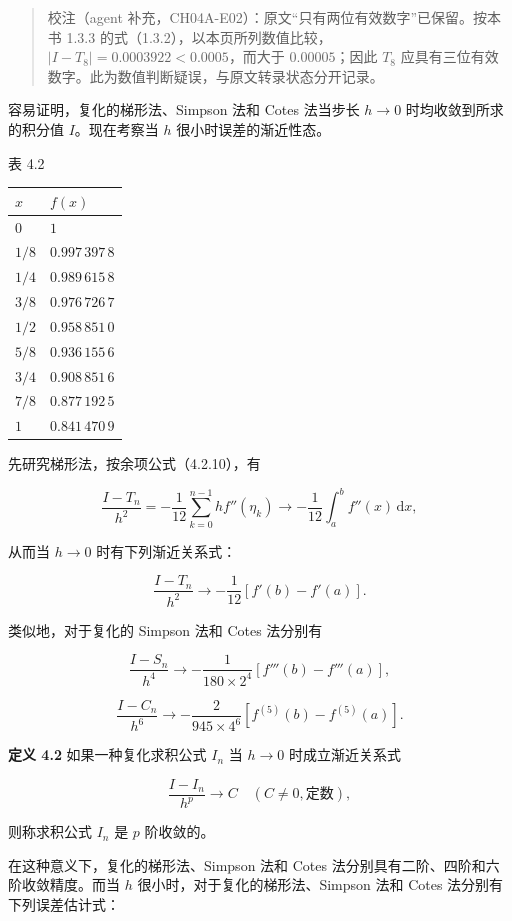 \begin{quote}
校注（agent 补充，CH04A-E02）：原文``只有两位有效数字''已保留。按本书 1.3.3 的式（1.3.2），以本页所列数值比较，\(|I-T_8|=0.0003922<0.0005\)，而大于 \(0.00005\)；因此 \(T_8\) 应具有三位有效数字。此为数值判断疑误，与原文转录状态分开记录。
\end{quote}

容易证明，复化的梯形法、Simpson 法和 Cotes 法当步长 \(h\to0\) 时均收敛到所求的积分值 \(I\)。现在考察当 \(h\) 很小时误差的渐近性态。

表 4.2

{\def\LTcaptype{none} %
\begin{longtable}[]{@{}ll@{}}
\toprule\noalign{}
\(x\) & \(f(x)\) \\
\midrule\noalign{}
\endhead
\bottomrule\noalign{}
\endlastfoot
\(0\) & \(1\) \\
\(1/8\) & \(0.997\,397\,8\) \\
\(1/4\) & \(0.989\,615\,8\) \\
\(3/8\) & \(0.976\,726\,7\) \\
\(1/2\) & \(0.958\,851\,0\) \\
\(5/8\) & \(0.936\,155\,6\) \\
\(3/4\) & \(0.908\,851\,6\) \\
\(7/8\) & \(0.877\,192\,5\) \\
\(1\) & \(0.841\,470\,9\) \\
\end{longtable}
}

先研究梯形法，按余项公式（4.2.10），有

\[
\frac{I-T_n}{h^2}=-\frac1{12}\sum_{k=0}^{n-1}hf''(\eta_k)\to-\frac1{12}\int_a^b f''(x)\,\mathrm{d}x,
\]

从而当 \(h\to0\) 时有下列渐近关系式：

\[
\frac{I-T_n}{h^2}\to-\frac1{12}[f'(b)-f'(a)].
\]

类似地，对于复化的 Simpson 法和 Cotes 法分别有

\[
\frac{I-S_n}{h^4}\to-\frac1{180\times2^4}[f'''(b)-f'''(a)],
\]

\[
\frac{I-C_n}{h^6}\to-\frac2{945\times4^6}[f^{(5)}(b)-f^{(5)}(a)].
\]

\textbf{定义 4.2} 如果一种复化求积公式 \(I_n\) 当 \(h\to0\) 时成立渐近关系式

\[
\frac{I-I_n}{h^p}\to C\quad(C\ne0,\text{定数}),
\]

则称求积公式 \(I_n\) 是 \(p\) 阶收敛的。

在这种意义下，复化的梯形法、Simpson 法和 Cotes 法分别具有二阶、四阶和六阶收敛精度。而当 \(h\) 很小时，对于复化的梯形法、Simpson 法和 Cotes 法分别有下列误差估计式：


